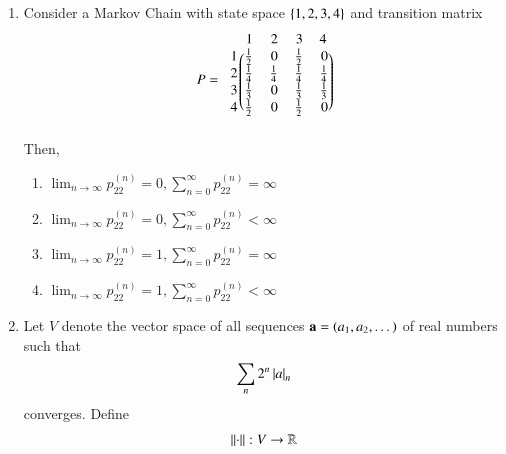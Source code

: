\begin{enumerate}[label=\thesection.\arabic*.,ref=\thesection.\theenumi]
\begin{enumerate}
\end{enumerate}
%
\item Consider a Markov Chain with state space $\left\{1,2, 3, 4\right\}$ and transition matrix
\begin{align}
P = 
\begin{blockarray}{c@{\hspace{1pt}}rrrr@{\hspace{3pt}}}
            & 1   & 2 & 3 & 4\\
        \begin{block}{r@{\hspace{3pt}}@{\hspace{1pt}}
    (@{\hspace{1pt}}rrrr@{\hspace{1pt}}@{\hspace{1pt}})}
        1 & \frac{1}{2} & 0 & \frac{1}{2} & 0  \\
        2 & \frac{1}{4}  & \frac{1}{4} & \frac{1}{4} & \frac{1}{4}  \\
        3 & \frac{1}{3}  & 0 & \frac{1}{3} & \frac{1}{3}  \\
%
        4 & \frac{1}{2} & 0 & \frac{1}{2} & 0  \\
        \end{block}
    \end{blockarray}
\end{align}
Then,
\begin{enumerate}
\item $\lim_{n \to \infty} p_{22}^{(n)} = 0, \sum_{n=0}^{\infty}p_{22}^{(n)} = \infty$
\item $\lim_{n \to \infty} p_{22}^{(n)} = 0, \sum_{n=0}^{\infty}p_{22}^{(n)} < \infty$
\item $\lim_{n \to \infty} p_{22}^{(n)} = 1, \sum_{n=0}^{\infty}p_{22}^{(n)} = \infty$
\item $\lim_{n \to \infty} p_{22}^{(n)} = 1, \sum_{n=0}^{\infty}p_{22}^{(n)} < \infty$
\end{enumerate}
\item Let $V$ denote the vector space of all sequences $\mathbf{a} = \left(a_1,a_2,\dots \right)$ of real numbers such that 
\begin{align}
\sum_{n}2^n\left\vert a\right\vert_n
\end{align}
converges.  Define
\begin{align}
\norm{\cdot}: V \to \mathbb{R}

\end{align}
\end{enumerate}
